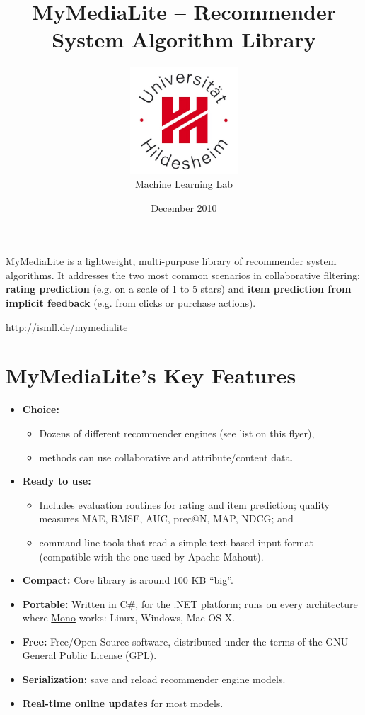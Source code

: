 \documentclass[a4paper, foldmark, 12pt]{leaflet}
\title{MyMediaLite -- Recommender System Algorithm Library}
\author{
	\includegraphics[width=4.0cm]{fig/uni-hildesheim-400x400.jpg}\\
	Machine Learning Lab
}
\date{December 2010}
\begin{document}
\maketitle

MyMediaLite is a lightweight, multi-purpose library
of recommender system algorithms.
It addresses the two most common scenarios in collaborative filtering:
\textbf{rating prediction} (e.g. on a scale of 1 to 5 stars)
and \textbf{item prediction from implicit feedback} (e.g. from clicks or purchase actions).

\begin{center}
	\url{http://ismll.de/mymedialite}
\end{center}

\newpage

\section{MyMediaLite's Key Features}


\begin{itemize}
	\item \textbf{Choice:}
		\begin{itemize}
			\item Dozens of different recommender engines (see list on this flyer),
			\item methods can use collaborative and attribute/content data.
		\end{itemize}
	\item \textbf{Ready to use:}
		\begin{itemize}
			\item Includes evaluation routines for rating and item prediction;
			      quality measures MAE, RMSE, AUC, prec@N, MAP, NDCG; and
			\item command line tools that read a simple text-based input format
                              (compatible with the one used by Apache Mahout).
		\end{itemize}
	\item \textbf{Compact:} Core library is around 100 KB ``big''.
	\item \textbf{Portable:} Written in C\#, for the .NET platform;
	      runs on every architecture where \href{www.mono-project.com}{Mono} works:
	      Linux, Windows, Mac OS X.
	\item \textbf{Free:} Free/Open Source software, distributed under the terms of the
	      GNU General Public License (GPL).
	\item \textbf{Serialization:} save and reload recommender engine models.
	\item \textbf{Real-time online updates} for most models.
\end{itemize}
\end{document}
